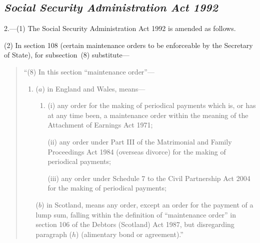 \documentclass[12pt,a4paper]{article}
\begin{document}

\subsection*{\itshape Social Security Administration Act 1992}

2.---(1) The Social Security Administration Act 1992 is amended as follows.

(2) In section 108 (certain maintenance orders to be enforceable by the Secretary of State), for subsection~(8) substitute—
\begin{quotation}
“(8) In this section “maintenance order”—
\begin{enumerate}\item[]
($a$) in England and Wales, means—
\begin{enumerate}\item[]
(i) any order for the making of periodical payments which is, or has at any time been, a maintenance order within the meaning of the Attachment of Earnings Act 1971;

(ii) any order under Part III of the Matrimonial and Family Proceedings Act 1984 (overseas divorce) for the making of periodical payments;

(iii) any order under Schedule 7 to the Civil Partnership Act 2004 for the making of periodical payments;
\end{enumerate}

($b$) in Scotland, means any order, except an order for the payment of a lump sum, falling within the definition of “maintenance order” in section 106 of the Debtors (Scotland) Act 1987, but disregarding paragraph ($h$) (alimentary bond or agreement).”
\end{enumerate}
\end{quotation}
\end{document}
